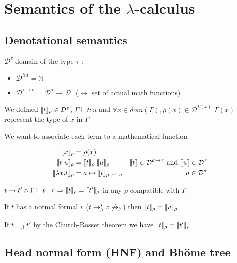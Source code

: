 \section{Semantics of the $\lambda$-calculus}

  \subsection{Denotational semantics}

    $\mathcal D^\tau$ domain of the type $\tau$ :

    \begin{itemize}
      \item $\mathcal D^{int} = \mathbb N$
      \item $\mathcal D^{\tau \to \sigma} = \mathcal D^\sigma \to \mathcal
        D^\tau$ ($\to$ set of actual math functions)
    \end{itemize}

    We defined $\llbracket t \rrbracket_\rho \in \mathcal D^\tau$, $\Gamma \vdash t : u$
    and $\forall x\in dom(\Gamma), \rho(x) \in \mathcal D^{\Gamma(x)}$
    $\Gamma(x)$ represent the type of $x$ in $\Gamma$

    We want to associate each term to a mathematical function

    \begin{align*}
      \llbracket x \rrbracket_\rho &= \rho(x) \\
      \llbracket t\;u \rrbracket_\rho &= \llbracket t \rrbracket_\rho\;\llbracket u \rrbracket_\rho
      & \llbracket t \rrbracket \in \mathcal D^{\sigma \to \tau} \text{ and }
        \llbracket u \rrbracket \in \mathcal D^\tau \\
      \llbracket \lambda x. t\rrbracket_\rho &= a \mapsto \llbracket t \rrbracket_{\rho. x\leftarrow a}
      & a \in \mathcal D^\sigma
    \end{align*}

    \lemma $t \to t' \wedge \Gamma \vdash t : \tau \Rightarrow \llbracket t
    \rrbracket_\rho = \llbracket t' \rrbracket_\rho$ in any $\rho$ compatible with $\Gamma$

    \corr If $t$ has a normal formal $v$ ($t \to_\beta^* v \not \to_\beta$)
      then $\llbracket t \rrbracket_\rho = \llbracket v \rrbracket_\rho$

    \corr If $t =_\beta t'$ by the Church-Rosser theorem we have $\llbracket t
    \rrbracket_\rho = \llbracket t' \rrbracket_\rho$

  \subsection{Head normal form (HNF) and Bhöme tree}

